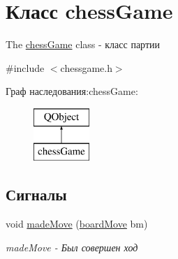 \hypertarget{classchess_game}{}\section{Класс chess\+Game}
\label{classchess_game}


The \hyperlink{classchess_game}{chess\+Game} class -\/ класс партии  




{\ttfamily \#include $<$chessgame.\+h$>$}

Граф наследования\+:chess\+Game\+:\begin{figure}[H]
\begin{center}
\leavevmode
\includegraphics[height=2.000000cm]{classchess_game}
\end{center}
\end{figure}
\subsection*{Сигналы}
\begin{DoxyCompactItemize}
\item 
void \hyperlink{classchess_game_a8c0d3a3a193aac0635d173b584c97bcd}{made\+Move} (\hyperlink{classboard_move}{board\+Move} bm)
\begin{DoxyCompactList}\small\item\em made\+Move -\/ Был совершен ход \end{DoxyCompactList}\end{DoxyCompactItemize}

